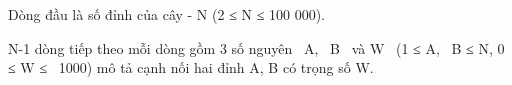 Dòng đầu là số đỉnh của cây - N (2 ≤ N ≤ 100 000).

N-1 dòng tiếp theo mỗi dòng gồm 3 số nguyên  A,  B  và W  (1 ≤ A,  B ≤ N, 0 ≤ W ≤  1000) mô tả cạnh nối hai đỉnh A, B có trọng số W.